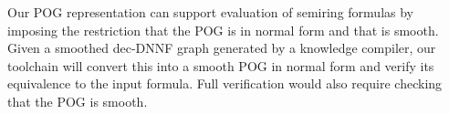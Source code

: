 \documentclass[twoside,11pt]{article}
\newcommand{\pand}{\mathbin{\land^\textsf{p}}}
\newcommand{\dependencyset}{{\cal D}}
\newcommand{\modelset}{{\cal M}}
\newcommand{\makenode}[1]{\mathbf{#1}}
\newcommand{\nodeu}{\makenode{u}}
\begin{document}
Our POG representation can support evaluation of semiring formulas by
imposing the restriction that the POG is in normal form and that is smooth.
Given a smoothed
dec-DNNF graph generated by a knowledge compiler, our toolchain will
convert this into a smooth POG in normal form and verify its
equivalence to the input formula.  Full verification would also require checking that the POG is smooth.







\end{document}
